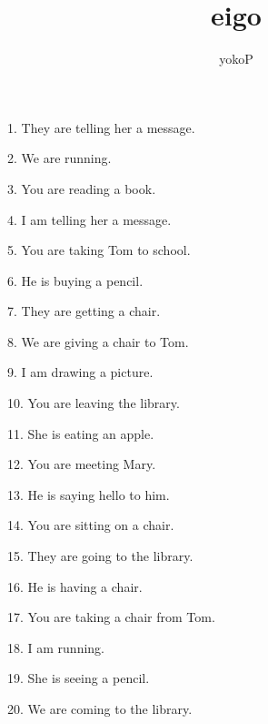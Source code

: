 \documentclass[uplatex,
paper=a4,
fontsize=18pt,
jafontsize=16pt,
number_of_lines=30,
line_length=30zh,
baselineskip=25pt,
]{jlreq}
\author{yokoP}
\title{eigo}
\begin{document}
1.  They are  telling her a message.

2.  We are  running.

3.  You are  reading a book.

4.  I am  telling her a message.

5.  You are  taking Tom to school.

6.  He is  buying a pencil.

7.  They are  getting a chair.

8.  We are  giving a chair to Tom.

9.  I am  drawing a picture.

10.  You are  leaving the library.

11.  She is  eating an apple.

12.  You are  meeting Mary.

13.  He is  saying hello to him.

14.  You are  sitting on a chair.

15.  They are  going to the library.

16.  He is  having a chair.

17.  You are  taking a chair from Tom.

18.  I am  running.

19.  She is  seeing a pencil.

20.  We are  coming to the library.
\end{document}

